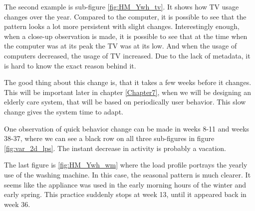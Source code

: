 The second example is sub-figure \ref{fig:HM_Ywh_tv}. It shows how TV usage changes over the year.
Compared to the computer, it is possible to see that the pattern looks a lot more persistent with slight changes.
Interestingly enough, when a close-up observation is made, it is possible to see that at the time when the computer was at its peak
the TV was at its low. And when the usage of computers decreased, the usage of TV increased. 
Due to the lack of metadata, it is hard to know the exact reason behind it. 

The good thing about this change is, that it takes a few weeks before it changes. 
This will be important later in chapter \ref{Chapter7}, when we will be designing an elderly care system, that will be based on periodically user behavior.
This slow change gives the system time to adapt. 

One observation of quick behavior change can be made in weeks 8-11 and weeks 38-37, where we can see a black row on all three sub-figures in figure \ref{fig:var_2d_lps}.
The instant decrease in activity is probably a vacation.

The last figure is \ref{fig:HM_Ywh_wm} where the load profile portrays the yearly use of the washing machine.
In this case, the seasonal pattern is much clearer. 
It seems like the appliance was used in the early morning hours of the winter and early spring.
This practice suddenly stops at week 13, until it appeared back in week 36.

